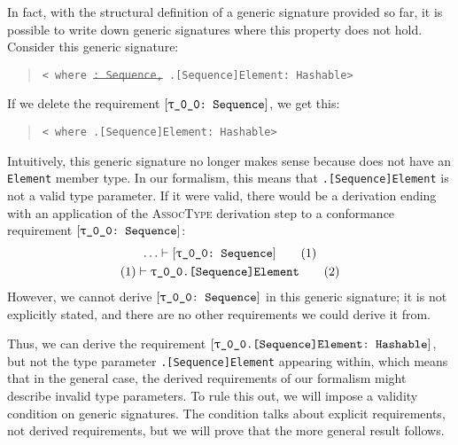 \documentclass[../generics]{subfiles}
\begin{document}
In fact, with the structural definition of a generic signature provided so far, it is possible to write down generic signatures where this property does not hold. Consider this generic signature:
\begin{quote}
\texttt{< where \sout{:~Sequence,} .[Sequence]Element:~Hashable>}
\end{quote}
If we delete the requirement $[\texttt{\texttt{$\uptau$\_0\_0}:~Sequence}]$, we get this:
\begin{quote}
\texttt{< where .[Sequence]Element:~Hashable>}
\end{quote}
Intuitively, this generic signature no longer makes sense because  does not have an \texttt{Element} member type. In our formalism, this means that \texttt{.[Sequence]Element} is not a valid type parameter. If it were valid, there would be a derivation ending with an application of the \textsc{AssocType} derivation step to a conformance requirement $[\texttt{\texttt{$\uptau$\_0\_0}:~Sequence}]$:
\begin{gather*}
\ldots\vdash [\texttt{\texttt{$\uptau$\_0\_0}:~Sequence}]\tag{1}\\
(1)\vdash \texttt{\texttt{$\uptau$\_0\_0}.[Sequence]Element}\tag{2}
\end{gather*}
However, we cannot derive $[\texttt{\texttt{$\uptau$\_0\_0}:~Sequence}]$ in this generic signature; it is not explicitly stated, and there are no other requirements we could derive it from.

Thus, we can derive the requirement $[\texttt{\texttt{$\uptau$\_0\_0}.[Sequence]Element:~Hashable}]$, but not the type parameter \texttt{.[Sequence]Element} appearing within, which means that in the general case, the derived requirements of our formalism might describe invalid type parameters. To rule this out, we will impose a validity condition on generic signatures. The condition talks about explicit requirements, not derived requirements, but we will prove that the more general result follows.
\end{document}
